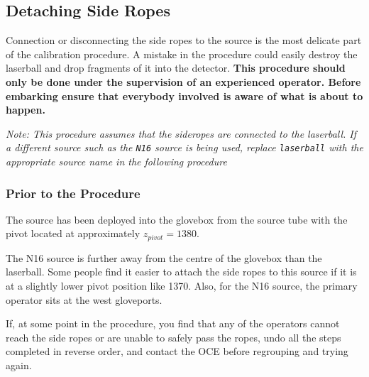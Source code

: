 \subsection{Detaching Side Ropes}

Connection or disconnecting the side ropes to the source is the most delicate part of the calibration procedure. A mistake in the procedure could easily destroy the laserball and drop fragments of it into the detector. {\bf This procedure should only be done under the supervision of an experienced operator. Before embarking ensure that everybody involved is aware of what is about to happen.}

{\it  Note: This procedure assumes that the sideropes  are connected to the laserball. If a different source such as the \verb+N16+ source is being used, replace \verb+laserball+ with the appropriate source name in the following procedure}

\subsubsection{Prior to the Procedure}
 The source has been deployed into the glovebox from the source tube with the pivot located at approximately $z_{pivot}=1380$.

The N16 source is further away from the centre of the glovebox than the laserball. Some people find it easier to attach the side ropes to this source if it is at a slightly lower pivot position like 1370. Also, for the N16 source, the primary operator sits at the west gloveports.

If, at some point in the procedure, you find that any of the operators cannot reach the side ropes or are unable to safely pass the ropes, undo all the steps completed in reverse order, and contact the OCE before regrouping and trying again.

